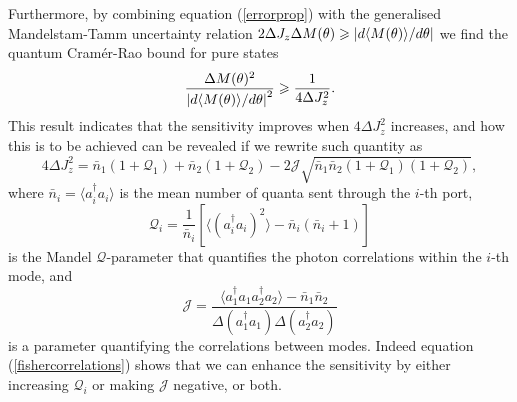 Furthermore, by combining equation (\ref{errorprop}) with the generalised Mandelstam-Tamm uncertainty relation $2 \Delta J_z \Delta M(\theta) \geqslant \abs{d \langle M(\theta)\rangle/d \theta}$ \cite{HofmannHolger2009} we find the quantum Cram\'{e}r-Rao bound for pure states \cite{HofmannHolger2009}
\begin{equation}
\frac{\Delta M(\theta)^2}{\abs{d\langle M(\theta) \rangle/d\theta}^2} \geqslant \frac{1}{4\Delta J_z^2}.
\label{simpleqcrb}
\end{equation}
This result indicates that the sensitivity improves when $4\Delta J_z^2$ increases, and how this is to be achieved can be revealed if we rewrite such quantity as \cite{sahota2015}
\begin{equation}
4\Delta J_z^2 = \bar{n}_1\left( 1 + \mathcal{Q}_1 \right) + \bar{n}_2\left( 1 + \mathcal{Q}_2 \right) - 2\mathcal{J}\sqrt{\bar{n}_1\bar{n}_2\left( 1 + \mathcal{Q}_1 \right)\left( 1 + \mathcal{Q}_2 \right)},
\label{fishercorrelations}
\end{equation}
where $\bar{n}_i = \langle a_i^\dagger a_i \rangle$ is the mean number of quanta sent through the $i$-th port, 
\begin{equation}
\mathcal{Q}_i = \frac{1}{\bar{n}_i}\left[\langle (a_i^\dagger a_i)^2 \rangle - \bar{n}_i\left(\bar{n}_i+ 1\right)\right]
\end{equation}
is the Mandel $\mathcal{Q}$-parameter that quantifies the photon correlations within the $i$-th mode, and
\begin{equation}
\mathcal{J} = \frac{\langle a_1^\dagger a_1 a_2^\dagger a_2 \rangle - \bar{n}_1\bar{n}_2}{\Delta(a_1^\dagger a_1) \Delta(a_2^\dagger a_2)}
\end{equation}
is a parameter quantifying the correlations between modes. Indeed equation (\ref{fishercorrelations}) shows that we can enhance the sensitivity by either increasing $\mathcal{Q}_i$ or making $\mathcal{J}$ negative, or both. 

